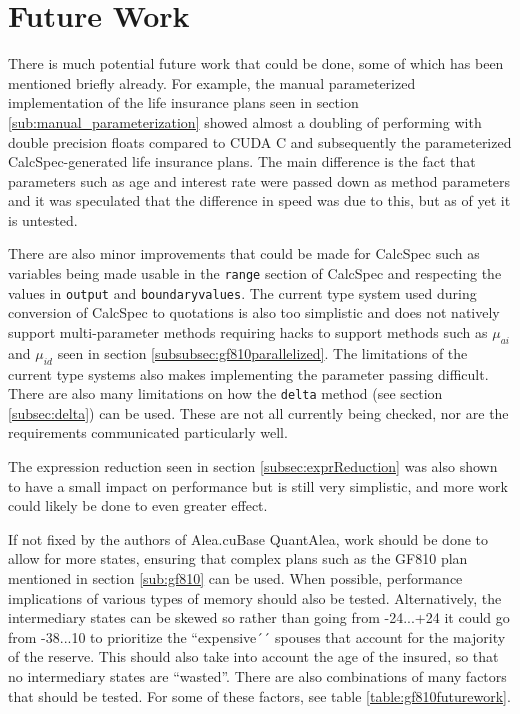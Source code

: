 \section{Future Work}
There is much potential future work that could be done, some of which has been mentioned briefly already.
For example, the manual parameterized implementation of the life insurance plans seen in section \ref{sub:manual_parameterization} showed almost a doubling of performing with double precision floats compared to CUDA C and subsequently the parameterized CalcSpec-generated life insurance plans.
The main difference is the fact that parameters such as age and interest rate were passed down as method parameters and it was speculated that the difference in speed was due to this, but as of yet it is untested.

There are also minor improvements that could be made for CalcSpec such as variables being made usable in the \lstinline$range$ section of CalcSpec and respecting the values in \lstinline$output$ and \lstinline$boundaryvalues$.
The current type system used during conversion of CalcSpec to quotations is also too simplistic and does not natively support multi-parameter methods requiring hacks to support methods such as $\mu_{ai}$ and $\mu_{id}$ seen in section \ref{subsubsec:gf810parallelized}.
The limitations of the current type systems also makes implementing the parameter passing difficult.
There are also many limitations on how the \lstinline$delta$ method (see section \ref{subsec:delta}) can be used.
These are not all currently being checked, nor are the requirements communicated particularly well.

The expression reduction seen in section \ref{subsec:exprReduction} was also shown to have a small impact on performance but is still very simplistic, and more work could likely be done to even greater effect.

If not fixed by the authors of Alea.cuBase QuantAlea, work should be done to allow for more states, ensuring that complex plans such as the GF810 plan mentioned in section \ref{sub:gf810} can be used.
When possible, performance implications of various types of memory should also be tested.
Alternatively, the intermediary states can be skewed so rather than going from -24...+24 it could go from -38...10 to prioritize the ``expensive´´ spouses that account for the majority of the reserve.
This should also take into account the age of the insured, so that no intermediary states are ``wasted''.
There are also combinations of many factors that should be tested.
For some of these factors, see table \ref{table:gf810futurework}.

